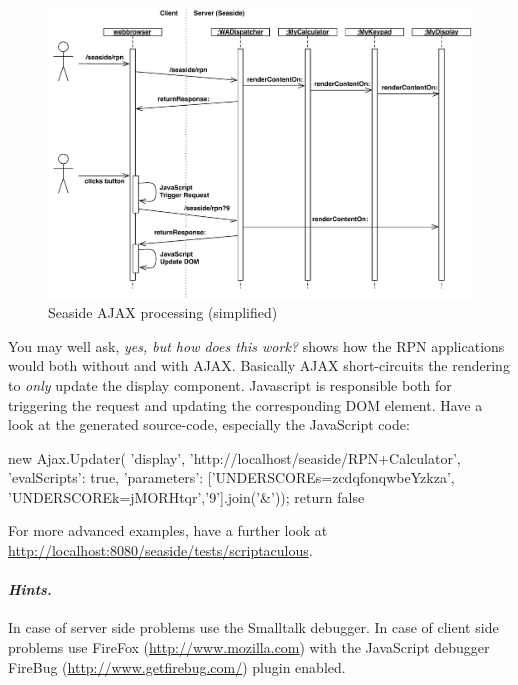 \documentclass[a4paper,10pt,twoside]{book}
\begin{document}
\begin{figure}[ht]
\begin{center}
\includegraphics[width=\textwidth]{ajax-processing}
\caption{Seaside AJAX processing (simplified)}
\end{center}
\end{figure}


You may well ask, \emph{yes, but how does this work?}
 shows how the RPN applications would both without and with AJAX.
Basically AJAX short-circuits the rendering to \emph{only} update the display component.
Javascript is responsible both for triggering the request and updating the corresponding DOM element.
Have a look at the generated source-code, especially the JavaScript code:

\begin{code}{}
new Ajax.Updater(
	'display',
	'http://localhost/seaside/RPN+Calculator',
	{'evalScripts': true,
	  'parameters': ['UNDERSCOREs=zcdqfonqwbeYzkza', 'UNDERSCOREk=jMORHtqr','9'].join('&')});
return false
\end{code}

For more advanced examples, have a further look at \url{http://localhost:8080/seaside/tests/scriptaculous}.

\paragraph{\emph{Hints.}}
In case of server side problems use the Smalltalk debugger.
In case of client side problems use FireFox (\url{http://www.mozilla.com}) with the JavaScript debugger FireBug (\url{http://www.getfirebug.com/}) plugin enabled.
\end{document}
